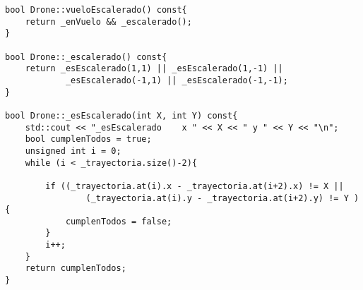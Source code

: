 \begin{lstlisting}
bool Drone::vueloEscalerado() const{
    return _enVuelo && _escalerado();
}

bool Drone::_escalerado() const{
    return _esEscalerado(1,1) || _esEscalerado(1,-1) ||
            _esEscalerado(-1,1) || _esEscalerado(-1,-1);
}

bool Drone::_esEscalerado(int X, int Y) const{
    std::cout << "_esEscalerado    x " << X << " y " << Y << "\n";
    bool cumplenTodos = true;
    unsigned int i = 0;
    while (i < _trayectoria.size()-2){

        if ((_trayectoria.at(i).x - _trayectoria.at(i+2).x) != X ||
                (_trayectoria.at(i).y - _trayectoria.at(i+2).y) != Y ){
            cumplenTodos = false;
        }
        i++;
    }
    return cumplenTodos;
}
\end{lstlisting}
